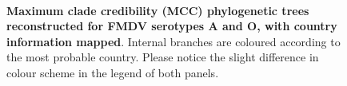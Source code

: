 \documentclass[10pt]{article}
\begin{document}
\newpage

\begin{figure}[!ht]
\begin{center}
\\
\end{center}
\caption{\textbf{Maximum clade credibility (MCC) phylogenetic trees reconstructed for FMDV serotypes A and O, with country information mapped}. 
Internal branches are coloured according to the most probable country.
Please notice the slight difference in colour scheme in the legend of both panels. %
}
\label{fig:trees}
\end{figure}
\end{document}
